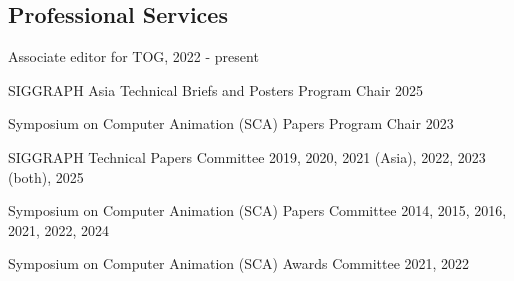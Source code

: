 \documentclass[margin,line]{res}
\newenvironment{list2}{
  \begin{list}{$\bullet$}{%
      \setlength{\itemsep}{0in}
      \setlength{\parsep}{0in} \setlength{\parskip}{0in}
      \setlength{\topsep}{0in} \setlength{\partopsep}{0in} 
      \setlength{\leftmargin}{0.2in}}}{\end{list}}
\begin{document}
\begin{resume}



\section{\sc Professional Services}
Associate editor for TOG, 2022 - present

\vspace*{-.15in}
SIGGRAPH Asia Technical Briefs and Posters Program Chair 2025

\vspace*{-.15in}
Symposium on Computer Animation (SCA) Papers Program Chair 2023

\vspace*{-.15in}
SIGGRAPH Technical Papers Committee 2019, 2020, 2021 (Asia), 2022, 2023 (both), 2025

\vspace*{-.15in}
Symposium on Computer Animation (SCA) Papers Committee 2014, 2015, 2016, 2021, 2022, 2024

\vspace*{-.15in}
Symposium on Computer Animation (SCA) Awards Committee 2021, 2022


\end{resume}
\end{document}
